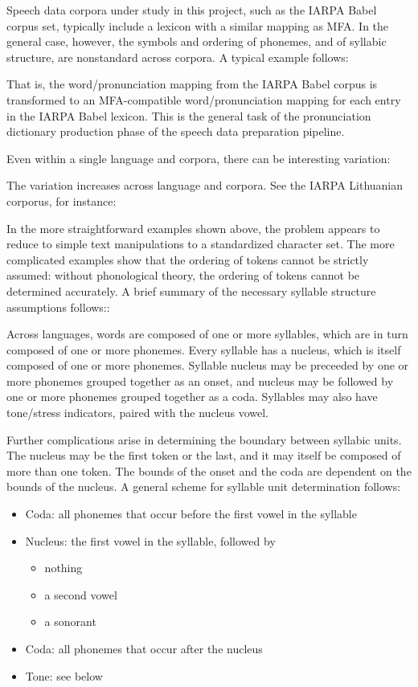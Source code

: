 \documentclass[11pt]{article}
\begin{document}
Speech data corpora under study in this project, such as the IARPA Babel corpus set, typically include a lexicon with a similar mapping as MFA. In the general case, however, the symbols and ordering of phonemes, and of syllabic structure, are nonstandard across corpora. A typical example follows:


That is, the word/pronunciation mapping from the IARPA Babel corpus is transformed to an MFA-compatible word/pronunciation mapping for each entry in the IARPA Babel lexicon. This is the general task of the pronunciation dictionary production phase of the speech data preparation pipeline.

Even within a single language and corpora, there can be interesting variation:


The variation increases across language and corpora. See the IARPA Lithuanian corporus, for instance:


In the more straightforward examples shown above, the problem appears to reduce to simple text manipulations to a standardized character set. The more complicated examples show that the ordering of tokens cannot be strictly assumed: without phonological theory, the ordering of tokens cannot be determined accurately. A brief summary of the necessary syllable structure assumptions follows:\cite{fromkin_introduction_2006}:

Across languages, words are composed of one or more syllables, which are in turn composed of one or more phonemes. Every syllable has a nucleus, which is itself composed of one or more phonemes. Syllable nucleus may be preceeded by one or more phonemes grouped together as an onset, and nucleus may be followed by one or more phonemes grouped together as a coda. Syllables may also have tone/stress indicators, paired with the nucleus vowel.

Further complications arise in determining the boundary between syllabic units. The nucleus may be the first token or the last, and it may itself be composed of more than one token. The bounds of the onset and the coda are dependent on the bounds of the nucleus. A general scheme for syllable unit determination follows:

\begin{itemize}
  \item Coda: all phonemes that occur before the first vowel in the syllable
  \item Nucleus: the first vowel in the syllable, followed by\begin{itemize}\item nothing\item a second vowel \item a sonorant\end{itemize}
  \item Coda: all phonemes that occur after the nucleus
  \item Tone: see below
\end{itemize}
\end{document}
